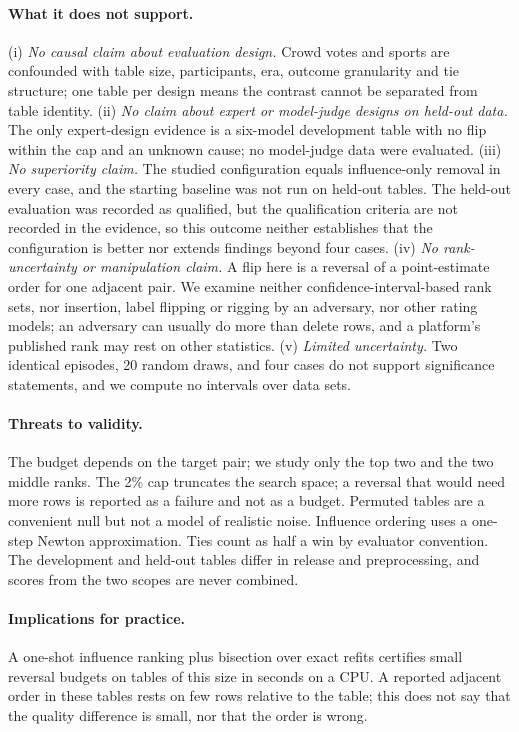 \documentclass{article}
\begin{document}
\paragraph{What it does not support.} (i) \emph{No causal claim about evaluation design.} Crowd votes and sports are confounded with table size, participants, era, outcome granularity and tie structure; one table per design means the contrast cannot be separated from table identity. (ii) \emph{No claim about expert or model-judge designs on held-out data.} The only expert-design evidence is a six-model development table with no flip within the cap and an unknown cause; no model-judge data were evaluated. (iii) \emph{No superiority claim.} The studied configuration equals influence-only removal in every case, and the starting baseline was not run on held-out tables. The held-out evaluation was recorded as qualified, but the qualification criteria are not recorded in the evidence, so this outcome neither establishes that the configuration is better nor extends findings beyond four cases. (iv) \emph{No rank-uncertainty or manipulation claim.} A flip here is a reversal of a point-estimate order for one adjacent pair. We examine neither confidence-interval-based rank sets, nor insertion, label flipping or rigging by an adversary, nor other rating models; an adversary can usually do more than delete rows, and a platform's published rank may rest on other statistics. (v) \emph{Limited uncertainty.} Two identical episodes, 20 random draws, and four cases do not support significance statements, and we compute no intervals over data sets.

\paragraph{Threats to validity.} The budget depends on the target pair; we study only the top two and the two middle ranks. The 2\% cap truncates the search space; a reversal that would need more rows is reported as a failure and not as a budget. Permuted tables are a convenient null but not a model of realistic noise. Influence ordering uses a one-step Newton approximation. Ties count as half a win by evaluator convention. The development and held-out tables differ in release and preprocessing, and scores from the two scopes are never combined.

\paragraph{Implications for practice.} A one-shot influence ranking plus bisection over exact refits certifies small reversal budgets on tables of this size in seconds on a CPU. A reported adjacent order in these tables rests on few rows relative to the table; this does not say that the quality difference is small, nor that the order is wrong.
\end{document}
